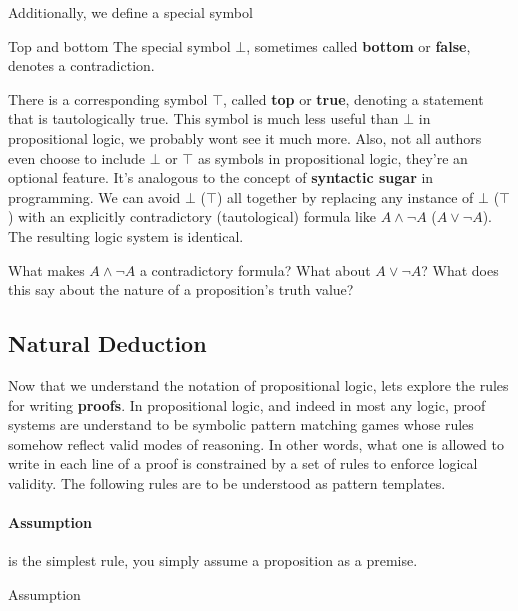 Additionally, we define a special symbol

\begin{definition}{Top and bottom}{}
	The special symbol $\bot$, sometimes called {\bf bottom} or {\bf false}, denotes a contradiction.
\end{definition}

There is a corresponding symbol $\top$, called {\bf top} or {\bf true}, denoting a statement that is tautologically true.
This symbol is much less useful than $\bot$ in propositional logic, we probably wont see it much more. Also, not all authors even choose to include $\bot$ or $\top$ as symbols in propositional logic, they're an optional feature.
It's analogous to the concept of {\bf syntactic sugar} in programming.
We can avoid $\bot$ ($\top$) all together by replacing any instance of $\bot$ ($\top$) with an explicitly contradictory (tautological) formula like $A\land \lnot A$ ($A \lor \lnot A$).
The resulting logic system is identical.

\begin{discuss}{}{}
	What makes $A \land \lnot A$ a contradictory formula? What about $A \lor \lnot A$?
	What does this say about the nature of a proposition's truth value? 
\end{discuss}


\subsection{Natural Deduction}

Now that we understand the notation of propositional logic, lets explore the rules for writing {\bf proofs}.
In propositional logic, and indeed in most any logic, proof systems are understand to be symbolic pattern matching games whose rules somehow reflect valid modes of reasoning.
In other words, what one is allowed to write in each line of a proof is constrained by a set of rules to enforce logical validity. The following rules are to be understood as pattern templates.

\paragraph{Assumption} is the simplest rule, you simply assume a proposition as a premise.

\begin{tcolorbox}[colback=purple!5!white,colframe=purple!75!black,title={\bf Conjunction Rules}]
	\centering
	\begin{lproof}{Assumption}
		\hline
	\end{lproof}
\end{tcolorbox}

